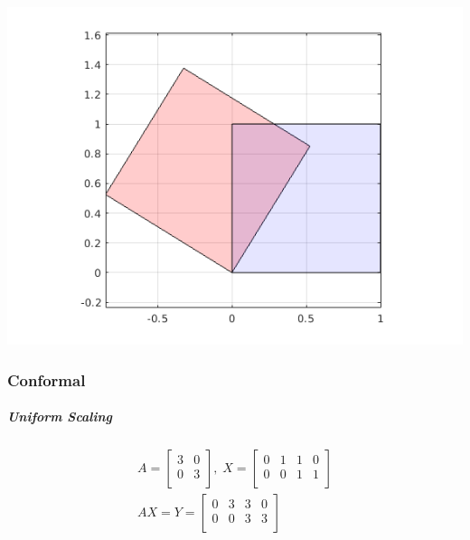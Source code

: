 \documentclass[MathsNotesBase.tex]{subfiles}
\begin{document}
{		\begin{center}
		\includegraphics[scale=0.85]{resources/img/GeometryOfMatrices_images/rotation.png}
		\end{center}
		
		\subsubsection{Conformal}
		\subparagraph{Uniform Scaling}
		\begin{align*}
		A =
		\begin{bmatrix}    
		3  &  0 \\
		0  &  3 \\		
		\end{bmatrix}
		,\; X = 
		\begin{bmatrix}  
		0   &  1  &   1  &   0 \\
		0   &  0  &   1  &   1	\\	
		\end{bmatrix} \\[10pt]
		AX = Y = 
		\begin{bmatrix}   
		0  &   3  &  3  &  0 \\
		0  &   0  &  3  &  3 \\
		\end{bmatrix}
		\end{align*}
	
}
\end{document}
